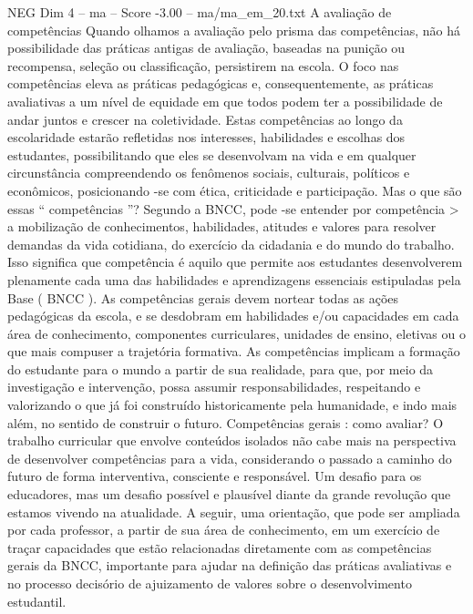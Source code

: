 \begin{textsample}{NEG Dim 4 – ma – Score -3.00 – ma/ma\_em\_20.txt}  \label{ex:f4_neg_232}
A avaliação de competências Quando olhamos a avaliação pelo prisma das competências, não há possibilidade das práticas antigas de avaliação, baseadas na punição ou recompensa, seleção ou classificação, persistirem na escola.
O foco nas competências eleva as práticas pedagógicas e, consequentemente, as práticas avaliativas a um nível de equidade em que todos podem ter a possibilidade de andar juntos e crescer na coletividade.
Estas competências ao longo da escolaridade estarão refletidas nos interesses, habilidades e escolhas dos estudantes, possibilitando que eles se desenvolvam na vida e em qualquer circunstância compreendendo os fenômenos sociais, culturais, políticos e econômicos, posicionando -se com ética, criticidade e participação.
Mas o que são essas “ competências ”?
Segundo a BNCC, pode -se entender por competência > a mobilização de conhecimentos, habilidades, atitudes e valores para resolver demandas da vida cotidiana, do exercício da cidadania e do mundo do trabalho.
Isso significa que competência é aquilo que permite aos estudantes desenvolverem plenamente cada uma das habilidades e aprendizagens essenciais estipuladas pela Base ( BNCC ).
As competências gerais devem nortear todas as ações pedagógicas da escola, e se desdobram em habilidades e/ou capacidades em cada área de conhecimento, componentes curriculares, unidades de ensino, eletivas ou o que mais compuser a trajetória formativa.
As competências implicam a formação do estudante para o mundo a partir de sua realidade, para que, por meio da investigação e intervenção, possa assumir responsabilidades, respeitando e valorizando o que já foi construído historicamente pela humanidade, e indo mais além, no sentido de construir o futuro.
Competências gerais : como avaliar?
O trabalho curricular que envolve conteúdos isolados não cabe mais na perspectiva de desenvolver competências para a vida, considerando o passado a caminho do futuro de forma interventiva, consciente e responsável.
Um desafio para os educadores, mas um desafio possível e plausível diante da grande revolução que estamos vivendo na atualidade.
A seguir, uma orientação, que pode ser ampliada por cada professor, a partir de sua área de conhecimento, em um exercício de traçar capacidades que estão relacionadas diretamente com as competências gerais da BNCC, importante para ajudar na definição das práticas avaliativas e no processo decisório de ajuizamento de valores sobre o desenvolvimento estudantil.

\end{textsample}
